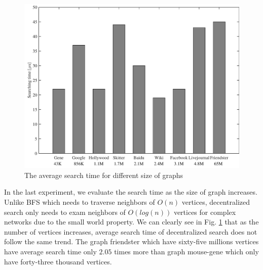\begin{figure}[t]
    \centering
    \includegraphics[width=\linewidth]{./figures/scale_graph.pdf}
    \caption{The average search time for different size of graphs}
    \label{fig:scale_graph}
\end{figure}

In the last experiment, we evaluate the search time as the size of graph increases. Unlike BFS which needs to traverse neighbors of $O(n)$ vertices, decentralized search only needs to exam neighbors of $O(log(n))$ vertices for complex networks due to the small world property. We can clearly see in Fig. \ref{fig:scale_graph} that as the number of vertices increases, average search time of decentralized search does not follow the same trend. The graph friendster which have sixty-five millions vertices have average search time only $2.05$ times more than graph mouse-gene which only have forty-three thousand vertices.

%
%

